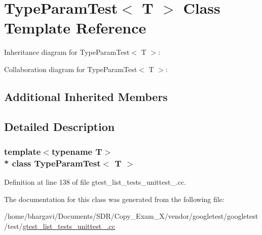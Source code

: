 \hypertarget{class_type_param_test}{}\section{Type\+Param\+Test$<$ T $>$ Class Template Reference}
\label{class_type_param_test}


Inheritance diagram for Type\+Param\+Test$<$ T $>$\+:


Collaboration diagram for Type\+Param\+Test$<$ T $>$\+:
\subsection*{Additional Inherited Members}


\subsection{Detailed Description}
\subsubsection*{template$<$typename T$>$\\*
class Type\+Param\+Test$<$ T $>$}



Definition at line 138 of file gtest\+\_\+list\+\_\+tests\+\_\+unittest\+\_\+.\+cc.



The documentation for this class was generated from the following file\+:\begin{DoxyCompactItemize}
\item 
/home/bhargavi/\+Documents/\+S\+D\+R/\+Copy\+\_\+\+Exam\+\_\+X/vendor/googletest/googletest/test/\hyperlink{gtest__list__tests__unittest___8cc}{gtest\+\_\+list\+\_\+tests\+\_\+unittest\+\_\+.\+cc}\end{DoxyCompactItemize}
